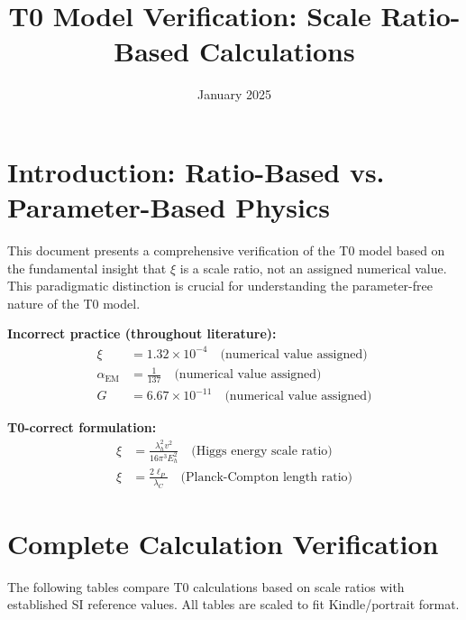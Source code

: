 \documentclass[12pt,a4paper]{article}
\begin{document}
\title{T0 Model Verification: Scale Ratio-Based Calculations}
\author{}
\date{January 2025}
\maketitle

\section{Introduction: Ratio-Based vs. Parameter-Based Physics}

This document presents a comprehensive verification of the T0 model based on the fundamental insight that $\xi$ is a scale ratio, not an assigned numerical value. This paradigmatic distinction is crucial for understanding the parameter-free nature of the T0 model.

\begin{tcolorbox}[colback=red!5!white,colframe=red!75!black,title=Fundamental Literature Error]
	\textbf{Incorrect practice (throughout literature):}
	\begin{align}
		\xi &= 1.32 \times 10^{-4} \quad \text{(numerical value assigned)} \\
		\alpha_{\text{EM}} &= \frac{1}{137} \quad \text{(numerical value assigned)} \\
		G &= 6.67 \times 10^{-11} \quad \text{(numerical value assigned)}
	\end{align}
	
	\textbf{T0-correct formulation:}
	\begin{align}
		\xi &= \frac{\lambda_h^2 v^2}{16\pi^3 E_h^2} \quad \text{(Higgs energy scale ratio)} \\
		\xi &= \frac{2\ell_P}{\lambda_C} \quad \text{(Planck-Compton length ratio)}
	\end{align}
\end{tcolorbox}

\section{Complete Calculation Verification}

The following tables compare T0 calculations based on scale ratios with established SI reference values. All tables are scaled to fit Kindle/portrait format.
\end{document}
